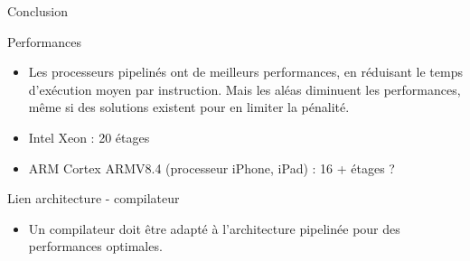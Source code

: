 %
\begin{Frame}{Conclusion}

\begin{block}{Performances}
       \begin{center}
 	\begin{itemize}
         \item Les processeurs pipelinés ont de meilleurs performances, en réduisant le temps d'exécution moyen par instruction. Mais les aléas diminuent les performances, même si des solutions existent pour en limiter la pénalité.
	\item Intel Xeon : 20 étages
	\item ARM Cortex ARMV8.4 (processeur iPhone, iPad) : 16 + étages ?

        \end{itemize}
       \end{center}
      \end{block}   

\begin{block}{Lien architecture - compilateur}
       \begin{center}
 	\begin{itemize}
         \item Un compilateur doit être adapté à l'architecture pipelinée pour des performances optimales.
        \end{itemize}
       \end{center}
      \end{block}   


\end{Frame}


